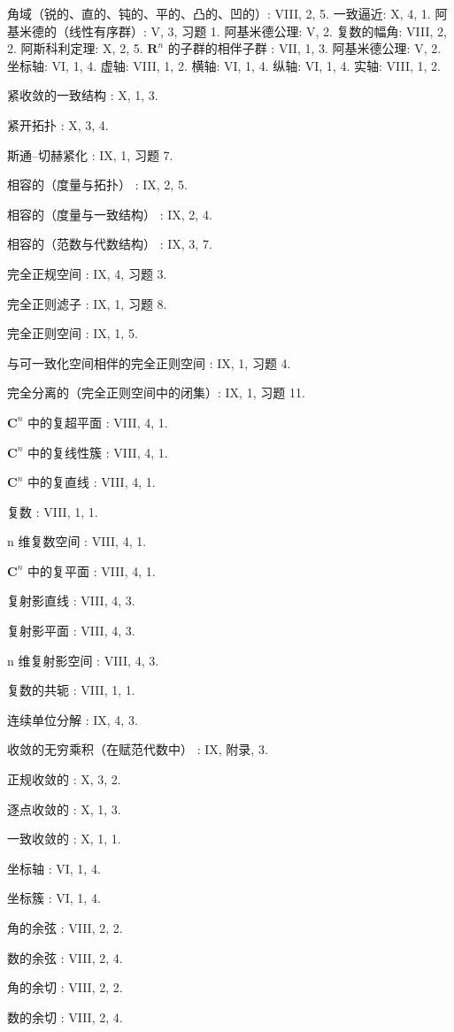 角域（锐的、直的、钝的、平的、凸的、凹的）: VIII, 2, 5. 一致逼近: X, 4, 1. 阿基米德的（线性有序群）: V, 3, 习题 1. 阿基米德公理: V, 2. 复数的幅角: VIII, 2, 2. 阿斯科利定理: X, 2, 5. \(\mathbf{R}^n\) 的子群的相伴子群 : VII, 1, 3. 阿基米德公理: V, 2. 坐标轴: VI, 1, 4. 虚轴: VIII, 1, 2. 横轴: VI, 1, 4. 纵轴: VI, 1, 4. 实轴: VIII, 1, 2.

紧收敛的一致结构 : X, 1, 3.

紧开拓扑 : X, 3, 4.

斯通–切赫紧化 : IX, 1, 习题 7.

相容的（度量与拓扑） : IX, 2, 5.

相容的（度量与一致结构） : IX, 2, 4.

相容的（范数与代数结构） : IX, 3, 7.

完全正规空间 : IX, 4, 习题 3.

完全正则滤子 : IX, 1, 习题 8.

完全正则空间 : IX, 1, 5.

与可一致化空间相伴的完全正则空间 : IX, 1, 习题 4.

完全分离的（完全正则空间中的闭集）: IX, 1, 习题 11.

\(\mathbf{C}^n\) 中的复超平面 : VIII, 4, 1.

\(\mathbf{C}^n\) 中的复线性簇 : VIII, 4, 1.

\(\mathbf{C}^n\) 中的复直线 : VIII, 4, 1.

复数 : VIII, 1, 1.

n 维复数空间 : VIII, 4, 1.

\(\mathbf{C}^n\) 中的复平面 : VIII, 4, 1.

复射影直线 : VIII, 4, 3.

复射影平面 : VIII, 4, 3.

n 维复射影空间 : VIII, 4, 3.

复数的共轭 : VIII, 1, 1.

连续单位分解 : IX, 4, 3.

收敛的无穷乘积（在赋范代数中） : IX, 附录, 3.

正规收敛的 : X, 3, 2.

逐点收敛的 : X, 1, 3.

一致收敛的 : X, 1, 1.

坐标轴 : VI, 1, 4.

坐标簇 : VI, 1, 4.

角的余弦 : VIII, 2, 2.

数的余弦 : VIII, 2, 4.

角的余切 : VIII, 2, 2.

数的余切 : VIII, 2, 4.

